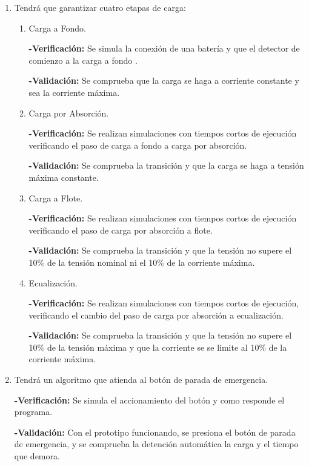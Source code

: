 \documentclass[11pt]{charter}
\begin{document}
\begin{enumerate}
\begin{enumerate}[label*=\arabic*.]
\begin{enumerate}[label*=\arabic*.]
				\item Tendrá que garantizar cuatro etapas de carga:
					\begin{enumerate}[label*=\arabic*.]
						\item Carga a Fondo.				
						
						\textbf{-Verificación:} Se simula la conexión de una batería y que el detector de comienzo a la carga a fondo . 
		
						\textbf{-Validación:} Se comprueba que la carga se haga a corriente constante y sea la corriente máxima.
				
						\item Carga por Absorción.	
						
						\textbf{-Verificación:} Se realizan simulaciones con tiempos cortos de ejecución verificando el paso de carga a fondo a carga por absorción. 
		
						\textbf{-Validación:} Se comprueba la transición y que la carga se haga a tensión máxima constante.
				
						\item Carga a Flote.
						
						\textbf{-Verificación:} Se realizan simulaciones con tiempos cortos de ejecución verificando el paso de carga por absorción a flote. 
		
						\textbf{-Validación:} Se comprueba la transición y que la tensión no supere el 10\% de la tensión nominal ni el 10\% de la corriente máxima.
						
						\item Ecualización.
						
						\textbf{-Verificación:} Se realizan simulaciones con tiempos cortos de ejecución, verificando el cambio del paso de carga por absorción a ecualización.  
		
						\textbf{-Validación:} Se comprueba la transición y que la tensión no supere el 10\% de la tensión máxima y que la corriente se se limite al 10\% de la corriente máxima.
				
					\end{enumerate}
				\item Tendrá un algoritmo que atienda al botón de parada de emergencia.
				
				\textbf{-Verificación:} Se simula el accionamiento del botón y como responde el programa.
		
				\textbf{-Validación:} Con el prototipo funcionando, se presiona el botón de parada de emergencia, y se comprueba la detención automática la carga y el tiempo que demora. 
				

\end{enumerate}
\end{enumerate}
\end{enumerate}
\end{document}
